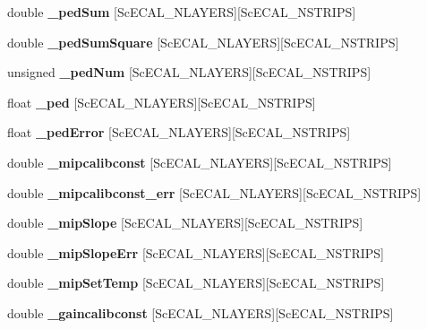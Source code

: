 \begin{DoxyCompactItemize}
\item 
double {\bfseries \_\-pedSum} [ScECAL\_\-NLAYERS][ScECAL\_\-NSTRIPS]\label{classCALICE_1_1IntegratedScECALCalibrationProcessor_a09e83cb1d46116f9bddd9f5f8259758e}

\item 
double {\bfseries \_\-pedSumSquare} [ScECAL\_\-NLAYERS][ScECAL\_\-NSTRIPS]\label{classCALICE_1_1IntegratedScECALCalibrationProcessor_a22ca651c37cdca77e318183ac28d124b}

\item 
unsigned {\bfseries \_\-pedNum} [ScECAL\_\-NLAYERS][ScECAL\_\-NSTRIPS]\label{classCALICE_1_1IntegratedScECALCalibrationProcessor_adaa3b48097f3a56add3a9dbaaac9d288}

\item 
float {\bfseries \_\-ped} [ScECAL\_\-NLAYERS][ScECAL\_\-NSTRIPS]\label{classCALICE_1_1IntegratedScECALCalibrationProcessor_a9d86971a1ebd696affd4df5702f84d93}

\item 
float {\bfseries \_\-pedError} [ScECAL\_\-NLAYERS][ScECAL\_\-NSTRIPS]\label{classCALICE_1_1IntegratedScECALCalibrationProcessor_ada246c89a647be0ab4b33365e461a0c2}

\item 
double {\bfseries \_\-mipcalibconst} [ScECAL\_\-NLAYERS][ScECAL\_\-NSTRIPS]\label{classCALICE_1_1IntegratedScECALCalibrationProcessor_acf61619680c7df4ffab1cf1a759b6f92}

\item 
double {\bfseries \_\-mipcalibconst\_\-err} [ScECAL\_\-NLAYERS][ScECAL\_\-NSTRIPS]\label{classCALICE_1_1IntegratedScECALCalibrationProcessor_a1fe73446252d0efa3e77523e2c645b1a}

\item 
double {\bfseries \_\-mipSlope} [ScECAL\_\-NLAYERS][ScECAL\_\-NSTRIPS]\label{classCALICE_1_1IntegratedScECALCalibrationProcessor_a51de70a9fb886693481b7c7e3173fed1}

\item 
double {\bfseries \_\-mipSlopeErr} [ScECAL\_\-NLAYERS][ScECAL\_\-NSTRIPS]\label{classCALICE_1_1IntegratedScECALCalibrationProcessor_a883ef441c0a3098f7319e1e8d48aada2}

\item 
double {\bfseries \_\-mipSetTemp} [ScECAL\_\-NLAYERS][ScECAL\_\-NSTRIPS]\label{classCALICE_1_1IntegratedScECALCalibrationProcessor_a256c3d9ae521ccef87b79c161616be65}

\item 
double {\bfseries \_\-gaincalibconst} [ScECAL\_\-NLAYERS][ScECAL\_\-NSTRIPS]\label{classCALICE_1_1IntegratedScECALCalibrationProcessor_ac01bc7902f8f262fa3590f0facb31ebc}


\end{DoxyCompactItemize}
